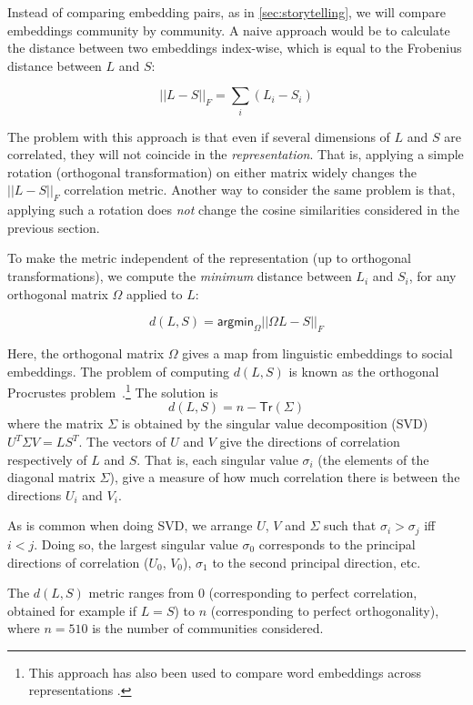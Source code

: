 \documentclass[11pt]{article}
\begin{document}

Instead of comparing embedding pairs, as in \cref{sec:storytelling}, 
we will compare embeddings community by community.
A naive approach would be to 
calculate the distance between two embeddings index-wise, which is
equal to the Frobenius distance between \(L\) and \(S\):

\[||L-S||_F = \sum_i (L_i - S_i)\]

The problem with this approach is that even if several dimensions of
\(L\) and \(S\) are correlated, they will not coincide in the
\emph{representation}. That is, applying a simple rotation (orthogonal
transformation) on either matrix widely changes the \(||L-S||_F\)
correlation metric. Another way to consider the same problem is that,
applying such a rotation does \emph{not} change the cosine similarities
considered in the previous section.

To make the metric independent of the representation (up to orthogonal
transformations), we compute the \emph{minimum} distance between
\(L_i\) and \(S_i\), for any orthogonal matrix \(\Omega\) applied to
\(L\):

\[d(L,S) = \mathsf{argmin}_\Omega ||ΩL-S||_F\]

Here, the orthogonal matrix \(Ω\) gives a map from linguistic embeddings to social embeddings.
The problem of computing \(d(L,S)\) is known as the orthogonal Procrustes problem~\citep{Gower2004}.\footnote{
This approach has also been used to compare word embeddings across representations \citep[e.g.,][]{Hamilton2016a}.}
The solution is
\[d(L,S) = n - \mathsf {Tr} (Σ)\] where the matrix \(Σ\) is obtained by the singular value
decomposition (SVD) \(U^TΣV = LS^T\). The vectors of \(U\) and \(V\) give
the directions of correlation respectively of \(L\) and \(S\). That is, each
singular value \(\sigma_i\) (the elements of the diagonal matrix \(Σ\)), give a measure of how much
correlation there is between the directions \(U_i\) and \(V_i\).

As is common when doing SVD, we arrange \(U\), \(V\) and \(Σ\) such
that \(σ_i > σ_j\) iff \(i < j\). Doing so, the largest singular value
\(σ_0\) corresponds to the principal directions of correlation
(\(U_0\), \(V_0\)), \(σ_1\) to the second principal direction, etc.

The \(d(L,S)\) metric ranges from \(0\) (corresponding to perfect
correlation, obtained for example if \(L=S\)) to \(n\) (corresponding
to perfect orthogonality), where $n=510$ is the number of communities
considered.
\end{document}
